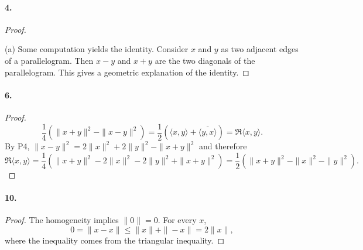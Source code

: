   \paragraph{4.}
  \begin{proof}
    $\,$\par
    (a) Some computation yields the identity. Consider $x$ and $y$ as two 
    adjacent edges of a parallelogram. Then $x-y$ and $x+y$ are the two 
    diagonals of the parallelogram. This gives a geometric explanation of the 
    identity.
  \end{proof}

  \paragraph{6.}
  \begin{proof}
    \[
      \frac{1}{4}(\|x+y\|^2-\|x-y\|^2) = 
      \frac{1}{2}(\langle x,y\rangle+\overline{\langle y,x\rangle})
      =\Re\langle x,y\rangle.
    \]
    By P4, $\|x-y\|^2 = 2\|x\|^2+2\|y\|^2-\|x+y\|^2$ and therefore
    \[
      \Re\langle x,y\rangle=
      \frac{1}{4}(\|x+y\|^2-2\|x\|^2-2\|y\|^2+\|x+y\|^2)=
      \frac{1}{2}(\|x+y\|^2-\|x\|^2-\|y\|^2).
    \]
  \end{proof}

  \paragraph{10.}
  \begin{proof}
    The homogeneity implies $\|0\|=0$. For every $x$,
    \[
      0=\|x-x\| \le \|x\|+\|-x\| = 2\|x\|,
    \]
    where the inequality comes from the triangular inequality.
  \end{proof}

